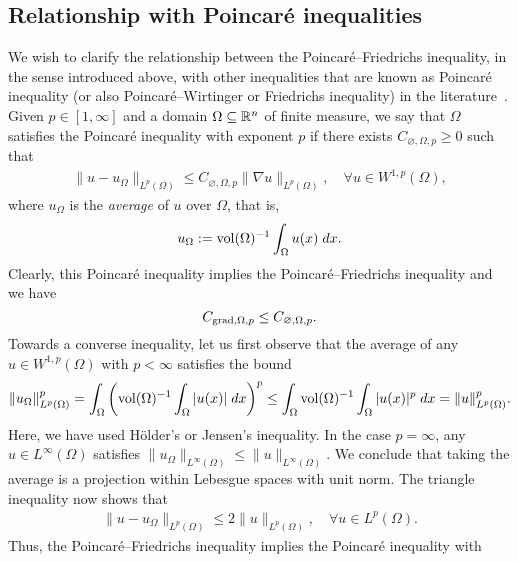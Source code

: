 \documentclass[10pt,a4paper]{article}
\begin{document}
\subsection{Relationship with Poincar\'e inequalities}

We wish to clarify the relationship between the Poincar\'e--Friedrichs inequality, in the sense introduced above, with other inequalities that are known as Poincar\'e inequality (or also Poincar\'e--Wirtinger or Friedrichs inequality) in the literature~\cite[Remark~3.32]{ern2021finite}. Given $p \in [1,\infty]$ and a domain $\Omega \subseteq {\mathbb R}^{n}$ of finite measure, 
we say that $\Omega$ satisfies the Poincar\'e inequality with exponent $p$ 
if there exists $C_{\varnothing,\Omega,p} \geq 0$ such that 
\begin{align*}
    \| u - u_{\Omega} \|_{L^{p}(\Omega)}
    \leq 
    C_{\varnothing,\Omega,p} 
    \| \nabla u \|_{L^{p}(\Omega)}
    ,
    \quad 
    \forall u \in W^{1,p}(\Omega)
    ,
\end{align*}
where $u_{\Omega}$ is the \emph{average} of $u$ over $\Omega$, that is,
\begin{align*}
    u_{\Omega} := \operatorname{vol}(\Omega)^{-1} \int_{\Omega} u(x) \;dx.
\end{align*}
Clearly, this Poincar\'e inequality implies the Poincar\'e--Friedrichs inequality and we have 
\[
    C_{\operatorname{grad},\Omega,p} \leq C_{\varnothing,\Omega,p}.
\]
Towards a converse inequality, 
let us first observe that the average of any $u \in W^{1,p}(\Omega)$ with $p < \infty$ satisfies the bound 
\begin{align} \label{math:aver_norm}
    \| u_\Omega \|_{L^{p}(\Omega)}^{p}
    = 
    \int_{\Omega} \left( \operatorname{vol}(\Omega)^{-1} \int_{\Omega} |u(x)| \;dx \right)^{p}
    \leq 
    \int_{\Omega} \operatorname{vol}(\Omega)^{-1} \int_{\Omega} |u(x)|^{p} \;dx
    = 
    \| u \|_{L^{p}(\Omega)}^{p}
    .
\end{align}
Here, we have used H\"older's or Jensen's inequality. 
In the case $p = \infty$, any $u \in L^{\infty}(\Omega)$ satisfies $\| u_\Omega \|_{L^{\infty}(\Omega)} \leq \| u \|_{L^{\infty}(\Omega)}$. 
We conclude that taking the average is a projection within Lebesgue spaces with unit norm. 
The triangle inequality now shows that 
\begin{align*}
    \| u - u_\Omega \|_{L^{p}(\Omega)} 
    \leq
    2
    \| u \|_{L^{p}(\Omega)},
    \quad 
    \forall
    u \in L^{p}(\Omega)
    .
\end{align*}
Thus, the Poincar\'e--Friedrichs inequality implies the Poincar\'e inequality with 
\end{document}
